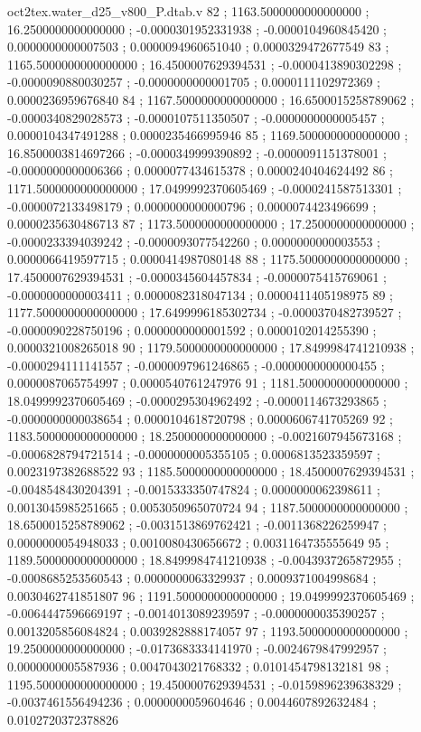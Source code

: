 \begin{filecontents}[overwrite]{oct2tex.water_d25_v800_P.dtab.v}
82 ; 1163.5000000000000000 ; 16.2500000000000000 ; -0.0000301952331938 ; -0.0000104960845420 ; 0.0000000000007503 ; 0.0000094960651040 ; 0.0000329472677549
83 ; 1165.5000000000000000 ; 16.4500007629394531 ; -0.0000413890302298 ; -0.0000090880030257 ; -0.0000000000001705 ; 0.0000111102972369 ; 0.0000236959676840
84 ; 1167.5000000000000000 ; 16.6500015258789062 ; -0.0000340829028573 ; -0.0000107511350507 ; -0.0000000000005457 ; 0.0000104347491288 ; 0.0000235466995946
85 ; 1169.5000000000000000 ; 16.8500003814697266 ; -0.0000349999390892 ; -0.0000091151378001 ; -0.0000000000006366 ; 0.0000077434615378 ; 0.0000240404624492
86 ; 1171.5000000000000000 ; 17.0499992370605469 ; -0.0000241587513301 ; -0.0000072133498179 ; 0.0000000000000796 ; 0.0000074423496699 ; 0.0000235630486713
87 ; 1173.5000000000000000 ; 17.2500000000000000 ; -0.0000233394039242 ; -0.0000093077542260 ; 0.0000000000003553 ; 0.0000066419597715 ; 0.0000414987080148
88 ; 1175.5000000000000000 ; 17.4500007629394531 ; -0.0000345604457834 ; -0.0000075415769061 ; -0.0000000000003411 ; 0.0000082318047134 ; 0.0000411405198975
89 ; 1177.5000000000000000 ; 17.6499996185302734 ; -0.0000370482739527 ; -0.0000090228750196 ; 0.0000000000001592 ; 0.0000102014255390 ; 0.0000321008265018
90 ; 1179.5000000000000000 ; 17.8499984741210938 ; -0.0000294111141557 ; -0.0000097961246865 ; -0.0000000000000455 ; 0.0000087065754997 ; 0.0000540761247976
91 ; 1181.5000000000000000 ; 18.0499992370605469 ; -0.0000295304962492 ; -0.0000114673293865 ; -0.0000000000038654 ; 0.0000104618720798 ; 0.0000606741705269
92 ; 1183.5000000000000000 ; 18.2500000000000000 ; -0.0021607945673168 ; -0.0006828794721514 ; -0.0000000005355105 ; 0.0006813523359597 ; 0.0023197382688522
93 ; 1185.5000000000000000 ; 18.4500007629394531 ; -0.0048548430204391 ; -0.0015333350747824 ; 0.0000000062398611 ; 0.0013045985251665 ; 0.0053050965070724
94 ; 1187.5000000000000000 ; 18.6500015258789062 ; -0.0031513869762421 ; -0.0011368226259947 ; 0.0000000054948033 ; 0.0010080430656672 ; 0.0031164735555649
95 ; 1189.5000000000000000 ; 18.8499984741210938 ; -0.0043937265872955 ; -0.0008685253560543 ; 0.0000000063329937 ; 0.0009371004998684 ; 0.0030462741851807
96 ; 1191.5000000000000000 ; 19.0499992370605469 ; -0.0064447596669197 ; -0.0014013089239597 ; -0.0000000035390257 ; 0.0013205856084824 ; 0.0039282888174057
97 ; 1193.5000000000000000 ; 19.2500000000000000 ; -0.0173683334141970 ; -0.0024679847992957 ; 0.0000000005587936 ; 0.0047043021768332 ; 0.0101454798132181
98 ; 1195.5000000000000000 ; 19.4500007629394531 ; -0.0159896239638329 ; -0.0037461556494236 ; 0.0000000059604646 ; 0.0044607892632484 ; 0.0102720372378826

\end{filecontents}
